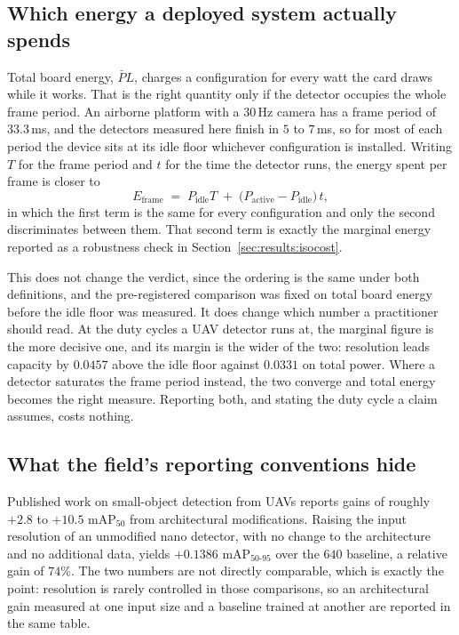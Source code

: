 \subsection{Which energy a deployed system actually spends}
\label{sec:discussion:energy}

Total board energy, $\bar{P} L$, charges a configuration for every watt the card draws
while it works. That is the right quantity only if the detector occupies the whole frame
period. An airborne platform with a 30\,Hz camera has a frame period of $33.3$\,ms, and the
detectors measured here finish in $5$ to $7$\,ms, so for most of each period the device
sits at its idle floor whichever configuration is installed. Writing $T$ for the frame
period and $t$ for the time the detector runs, the energy spent per frame is closer to
\begin{equation}
  E_{\text{frame}} \;=\; P_{\text{idle}} T \;+\; \big(P_{\text{active}} - P_{\text{idle}}\big)\, t ,
  \label{eq:frame-energy}
\end{equation}
in which the first term is the same for every configuration and only the second
discriminates between them. That second term is exactly the marginal energy reported as a
robustness check in Section~\ref{sec:results:isocost}.

This does not change the verdict, since the ordering is the same under both definitions,
and the pre-registered comparison was fixed on total board energy before the idle floor was
measured. It does change which number a practitioner should read. At the duty cycles a UAV
detector runs at, the marginal figure is the more decisive one, and its margin is the wider
of the two: resolution leads capacity by $0.0457$ above the idle floor against $0.0331$ on
total power. Where a detector saturates the frame period instead, the two converge and
total energy becomes the right measure. Reporting both, and stating the duty cycle a claim
assumes, costs nothing.

\subsection{What the field's reporting conventions hide}
\label{sec:discussion:conventions}

Published work on small-object detection from UAVs reports gains of roughly $+2.8$ to
$+10.5$ mAP$_{50}$ from architectural modifications. Raising the input resolution of an
unmodified nano detector, with no change to the architecture and no additional data, yields
$+0.1386$ mAP$_{50\text{-}95}$ over the $640$ baseline, a relative gain of $74\%$. The two
numbers are not directly comparable, which is exactly the point: resolution is rarely
controlled in those comparisons, so an architectural gain measured at one input size and a
baseline trained at another are reported in the same table.

